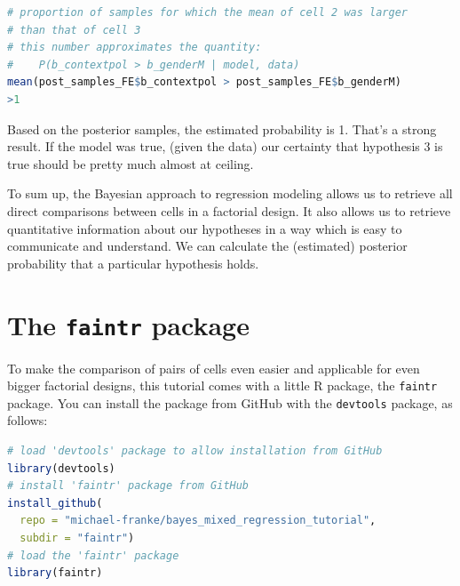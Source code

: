 \documentclass[nobib]{tufte-handout}
\begin{document}
\begin{minipage}[]{1.1\textwidth}
\begin{lstlisting}[language=R]
# proportion of samples for which the mean of cell 2 was larger 
# than that of cell 3 
# this number approximates the quantity:
#    P(b_contextpol > b_genderM | model, data)
mean(post_samples_FE$b_contextpol > post_samples_FE$b_genderM)
>1
\end{lstlisting}
\end{minipage}

\vspace{-0.5cm}

Based on the posterior samples, the estimated probability is 1. That's a strong result. If the model was true, (given the data) our certainty that hypothesis 3 is true should be pretty much almost at ceiling.

To sum up, the Bayesian approach to regression modeling allows us to retrieve all direct comparisons between cells in a factorial design. It also allows us to retrieve quantitative information about our hypotheses in a way which is easy to communicate and understand. We can calculate the (estimated) posterior probability that a particular hypothesis holds. 

\section{The \texttt{faintr} package}

To make the comparison of pairs of cells even easier and applicable for even bigger factorial designs, this tutorial comes with a little R package, the \texttt{faintr} package.
%
%
You can install the package from GitHub with the \texttt{devtools} package, as follows:

\begin{minipage}[]{1.3\textwidth}
\begin{lstlisting}[language=R]
# load 'devtools' package to allow installation from GitHub
library(devtools)
# install 'faintr' package from GitHub
install_github(
  repo = "michael-franke/bayes_mixed_regression_tutorial", 
  subdir = "faintr")
# load the 'faintr' package
library(faintr)
\end{lstlisting}
\end{minipage}
\end{document}
